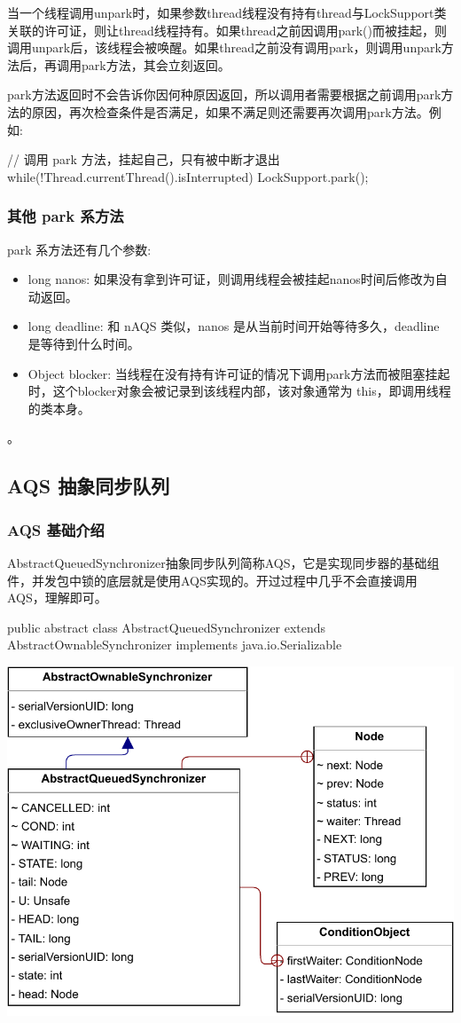 当一个线程调用unpark时，如果参数thread线程没有持有thread与LockSupport类关联的许可证，则让thread线程持有。如果thread之前因调用park()而被挂起，则调用unpark后，该线程会被唤醒。如果thread之前没有调用park，则调用unpark方法后，再调用park方法，其会立刻返回。

park方法返回时不会告诉你因何种原因返回，所以调用者需要根据之前调用park方法的原因，再次检查条件是否满足，如果不满足则还需要再次调用park方法。例如:

\begin{Java}
// 调用 park 方法，挂起自己，只有被中断才退出
while(!Thread.currentThread().isInterrupted) {
    LockSupport.park();
}
\end{Java}

\subsubsection*{其他 park 系方法}

park 系方法还有几个参数:
\begin{itemize}
    \item long nanos: 如果没有拿到许可证，则调用线程会被挂起nanos时间后修改为自动返回。
    \item long deadline: 和 nAQS 类似，nanos 是从当前时间开始等待多久，deadline 是等待到什么时间。
    \item Object blocker: 当线程在没有持有许可证的情况下调用park方法而被阻塞挂起时，这个blocker对象会被记录到该线程内部，该对象通常为 this，即调用线程的类本身。
\end{itemize}。

\subsection{AQS 抽象同步队列}
\subsubsection{AQS 基础介绍}

AbstractQueuedSynchronizer抽象同步队列简称AQS，它是实现同步器的基础组件，并发包中锁的底层就是使用AQS实现的。开过过程中几乎不会直接调用 AQS，理解即可。

\begin{Java}
public abstract class AbstractQueuedSynchronizer extends AbstractOwnableSynchronizer implements java.io.Serializable
\end{Java}

\begin{center}
    \includegraphics[width=0.6\linewidth]{../../../Images/AQS.pdf}
\end{center}

